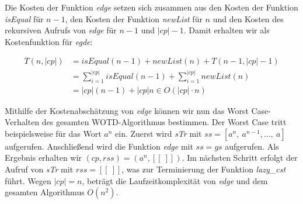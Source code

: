 \documentclass[12pt]{report}
\newcommand{\abs}[1]{\left|#1\right|}
\begin{document}

Die Kosten der Funktion \textit{edge} setzen sich zusammen aus den Kosten der Funktion \textit{isEqual} für $n - 1$, den Kosten der Funktion \textit{newList} für $n$ und den Kosten des rekursiven Aufrufs von \textit{edge} für $n - 1$ und $\abs{cp} - 1$. Damit erhalten wir als Kostenfunktion für \textit{egde}:

\begin{align*}
    T(n,\abs{cp}) &= isEqual(n - 1) + newList(n) + T(n-1,\abs{cp}-1) \\
                  &= \sum_{i = 1}^{\abs{cp}}{isEqual(n-1)} + \sum_{i = 1}^{\abs{cp}}{newList(n)}\\
                  &= \abs{cp} (n - 1) + \abs{cp} n \in O(\abs{cp} \cdot n)
\end{align*}

Mithilfe der Kostenabschätzung von \textit{edge} können wir nun das Worst Case-Verhalten des gesamten WOTD-Algorithmus bestimmen. Der Worst Case tritt beispielsweise für das Wort $a^n$ ein.  Zuerst wird \textit{sTr} mit $ss = [a^n,\:a^{n-1}, \dots ,\:a]$ aufgerufen. Anschließend wird die Funktion \textit{edge} mit $ss = gs$ aufgerufen. Als Ergebnis erhalten wir $(cp,rss) = (a^n, [[\:]])$. Im nächsten Schritt erfolgt der Aufruf von \textit{sTr} mit $rss = [[\:]]$, was zur Terminierung der Funktion \textit{lazy\_cst} führt. Wegen $\abs{cp} = n$, beträgt die Laufzeitkomplexität von \textit{edge} und dem gesamten Algorithmus $O(n^2)$.

\end{document}
